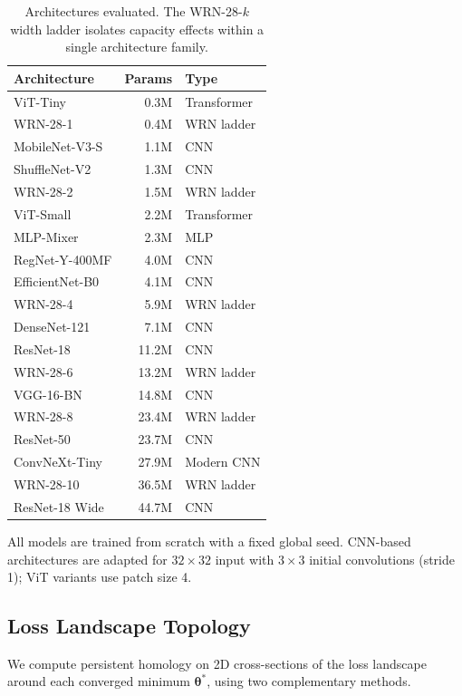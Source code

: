 \documentclass[10pt,twocolumn]{article}
\begin{document}
\begin{table}[t]
\centering
\caption{Architectures evaluated. The WRN-28-$k$ width ladder isolates capacity effects within a single architecture family.}
\label{tab:architectures}
\small
\begin{tabular}{@{}lrl@{}}
\toprule
Architecture & Params & Type \\
\midrule
ViT-Tiny         & 0.3M  & Transformer \\
WRN-28-1         & 0.4M  & WRN ladder \\
MobileNet-V3-S   & 1.1M  & CNN \\
ShuffleNet-V2    & 1.3M  & CNN \\
WRN-28-2         & 1.5M  & WRN ladder \\
ViT-Small        & 2.2M  & Transformer \\
MLP-Mixer        & 2.3M  & MLP \\
RegNet-Y-400MF   & 4.0M  & CNN \\
EfficientNet-B0  & 4.1M  & CNN \\
WRN-28-4         & 5.9M  & WRN ladder \\
DenseNet-121     & 7.1M  & CNN \\
ResNet-18        & 11.2M & CNN \\
WRN-28-6         & 13.2M & WRN ladder \\
VGG-16-BN        & 14.8M & CNN \\
WRN-28-8         & 23.4M & WRN ladder \\
ResNet-50        & 23.7M & CNN \\
ConvNeXt-Tiny    & 27.9M & Modern CNN \\
WRN-28-10        & 36.5M & WRN ladder \\
ResNet-18 Wide   & 44.7M & CNN \\
\bottomrule
\end{tabular}
\end{table}

All models are trained from scratch with a fixed global seed. CNN-based architectures are adapted for $32 \times 32$ input with $3 \times 3$ initial convolutions (stride 1); ViT variants use patch size 4.

\subsection{Loss Landscape Topology}
\label{sec:topology}

We compute persistent homology on 2D cross-sections of the loss landscape around each converged minimum $\boldsymbol{\theta}^*$, using two complementary methods.
\end{document}
